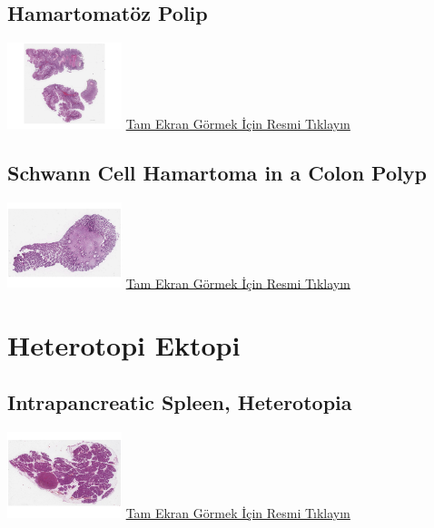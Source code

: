 \documentclass[
  letterpaper,
  DIV=11,
  numbers=noendperiod]{scrreprt}
\begin{document}
\hypertarget{sec-hamartomatoz-polip}{%
\section{Hamartomatöz Polip}\label{sec-hamartomatoz-polip}}

\href{https://images.patolojiatlasi.com/hamartomatouspolyp/HE.html}{\includegraphics[width=0.25\textwidth,height=\textheight]{./screenshots/hamartomatouspolyp_screenshot.png}}
\href{https://images.patolojiatlasi.com/hamartomatouspolyp/HE.html}{Tam
Ekran Görmek İçin Resmi Tıklayın}

\hypertarget{sec-schwann-cell-hamartoma-colon-polyp}{%
\section{Schwann Cell Hamartoma in a Colon
Polyp}\label{sec-schwann-cell-hamartoma-colon-polyp}}

\href{https://images.patolojiatlasi.com/schwanncellhamartoma/HE.html}{\includegraphics[width=0.25\textwidth,height=\textheight]{./screenshots/schwanncellhamartoma_screenshot.png}}
\href{https://images.patolojiatlasi.com/schwanncellhamartoma/HE.html}{Tam
Ekran Görmek İçin Resmi Tıklayın}

\hypertarget{sec-heterotopi-ektopi}{%
\chapter{Heterotopi Ektopi}\label{sec-heterotopi-ektopi}}

\hypertarget{sec-intrapancreatic-spleen}{%
\section{Intrapancreatic Spleen,
Heterotopia}\label{sec-intrapancreatic-spleen}}

\href{https://images.patolojiatlasi.com/intrapancreaticspleen/HE.html}{\includegraphics[width=0.25\textwidth,height=\textheight]{./screenshots/intrapancreaticspleen_screenshot.png}}
\href{https://images.patolojiatlasi.com/intrapancreaticspleen/HE.html}{Tam
Ekran Görmek İçin Resmi Tıklayın}
\end{document}
